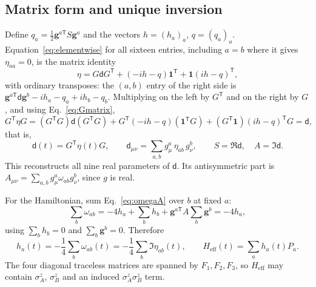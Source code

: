 \documentclass[11pt,a4paper]{article}
\newcommand{\dmat}{\mathsf d}
\newcommand{\Heff}{H_{\mathrm{eff}}}
\begin{document}
\subsection{Matrix form and unique inversion}
\label{sec:inversion}

Define $q_a=\frac12\mathbf g^{a\mathsf T}S\mathbf g^a$ and the vectors
$h=(h_a)_a$, $q=(q_a)_a$. Equation~\eqref{eq:elementwise} for all sixteen
entries, including $a=b$ where it gives $\eta_{aa}=0$, is the matrix
identity
\begin{equation}
 \eta=G\dmat G^{\mathsf T}+(-ih-q)\mathbf1^{\mathsf T}+\mathbf1(ih-q)^{\mathsf T},
 \label{eq:etamatrix}
\end{equation}
with ordinary transposes: the $(a,b)$ entry of the right side is
$\mathbf g^{a\mathsf T}\dmat\mathbf g^b-ih_a-q_a+ih_b-q_b$. Multiplying on
the left by $G^{\mathsf T}$ and on the right by $G$, and using
Eq.~\eqref{eq:Gmatrix},
\begin{equation}
 G^{\mathsf T}\eta G=(G^{\mathsf T}G)\dmat(G^{\mathsf T}G)
 +G^{\mathsf T}(-ih-q)(\mathbf1^{\mathsf T}G)
 +(G^{\mathsf T}\mathbf1)(ih-q)^{\mathsf T}G=\dmat,
\end{equation}
that is,
\begin{equation}
 \boxed{\dmat(t)=G^{\mathsf T}\eta(t)G,\qquad
 \dmat_{\mu\nu}=\sum_{a,b}g_\mu^a\,\eta_{ab}\,g_\nu^b,\qquad
 S=\Re\dmat,\quad A=\Im\dmat.}
 \label{eq:dfrometa}
\end{equation}
This reconstructs all nine real parameters of $\dmat$. Its antisymmetric
part is $A_{\mu\nu}=\sum_{a,b}g_\mu^a\omega_{ab}g_\nu^b$, since $g$ is real.

For the Hamiltonian, sum Eq.~\eqref{eq:omegaA} over $b$ at fixed $a$:
\begin{equation}
 \sum_b\omega_{ab}=-4h_a+\sum_bh_b
 +\mathbf g^{a\mathsf T}A\sum_b\mathbf g^b=-4h_a,
\end{equation}
using $\sum_bh_b=0$ and $\sum_b\mathbf g^b=0$. Therefore
\begin{equation}
 \boxed{h_a(t)=-\frac14\sum_{b}\omega_{ab}(t)
 =-\frac14\sum_{b}\Im\eta_{ab}(t),\qquad
 \Heff(t)=\sum_ah_a(t)P_a .}
 \label{eq:canonicalH}
\end{equation}
The four diagonal traceless matrices are spanned by $F_1,F_2,F_3$, so
$\Heff$ may contain $\sigma_A^z$, $\sigma_B^z$ and an induced
$\sigma_A^z\sigma_B^z$ term.
\end{document}
